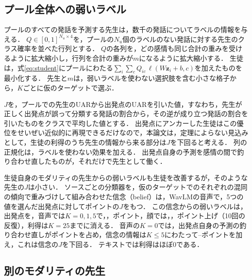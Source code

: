 \subsection{プール全体への弱いラベル}
\label{sec:part2-weak}

プールのすべての発話を予測する先生は，数千の発話についてラベルの情報を与える．
$Q \in [0,1]^{N_u \times 4}$を，プールの$N_u$個のラベルのない発話に対する先生のクラス確率を並べた行列とする．
$Q$の各列を，どの感情も同じ合計の重みを受けるように拡大縮小し，行列を合計の重みが$m$になるように拡大縮小する．
生徒は，式\eqref{eq:student}にプールにわたる$\sum_{i}\sum_{c} Q_{ic}\,\ell(W\mathbf{z}_i + b, c)$を加えたものを最小化する．
先生と$m$は，弱いラベルを使わない選択肢を含む小さな格子から，$K$ごとに仮のターゲットで選ぶ．

$J$を，プールでの先生のUARから出発点のUARを引いた値，すなわち，先生が正しく出発点が誤って分類する発話の割合から，その逆が成り立つ発話の割合を引いたものをクラスで平均した値とする．
出発点にアンカーした生徒はこの優位をせいぜい近似的に再現できるだけなので，本論文は，定理によらない見込みとして，生徒の利得のうち先生の情報から来る部分は$J$を下回ると考える．
列の正規化は，ラベルを使わない効果を加える．
出発点自身の予測を感情の間で釣り合わせ直したものが，それだけで先生として働く．

生徒自身のモダリティの先生からの弱いラベルも生徒を改善するが，そのような先生の$J$は小さい．
ソースごとの分類器を，仮のターゲットでのそれぞれの混同の傾向で重みづけして組み合わせた信念（belief）は，WavLMの音声で，5つの値を選んだ出発点に対してポイントの$J$をもつ．
この信念からの弱いラベルは，出発点を，音声では$K = 0, 1, 5$で，，ポイント，顔では，，ポイント上げ（10回の反復），利得は$K=25$までに消える．
音声の$K=0$では，出発点自身の予測の釣り合わせ直しがポイントを占め，信念の情報は$K \le 5$にわたって--ポイントを加え，これは信念の$J$を下回る．
テキストでは利得はほぼ0である．

\subsection{別のモダリティの先生}
\label{sec:part2-crossmodal}

